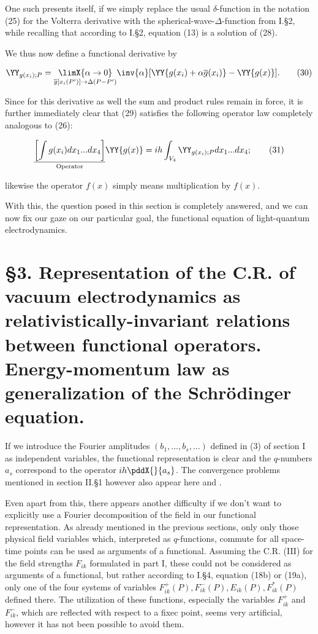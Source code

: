 \documentclass{article}
\newcommand{\nequ}[2]{
\begin{align*}
#1
\tag{#2}
\end{align*}
}
\begin{document}
One such presents itself, if we simply replace the usual $\delta$-function in the notation (25) for the Volterra derivative with the spherical-wave-$\Delta$-function from I.§2, while recalling that according to I.§2, equation (13) is a solution of (28).

We thus now define a functional derivative by
\nequ{
\YY_{g(x_i);P} =\underset{
 \overline{g}\left[x_i(P')\right] \to \Delta(P-P')
}{\limX{\alpha\to 0}}
\inv{\alpha}[\YY\{g(x_i) + \alpha\overline{g}(x_i)\}
 - \YY\{g(x)\}
].}{30}
Since for this derivative as well the sum and product rules remain in force, it is further immediately clear that (29) satisfies the following operator law completely analogous to (26):
\nequ{
\underset{\text{Operator}}{\underline{\left[\int g(x_i)dx_1...dx_4\right]}}\YY\{g(x)\}
 = ih\int_{V_4}\YY_{g(x_i);P} dx_1 ... dx_4
 ;}{31}
likewise the operator $f(x)$ simply means multiplication by $f(x)$.

With this, the question posed in this section is completely answered, and we can now fix our gaze on our particular goal, the functional equation of light-quantum electrodynamics.

\section*{§3. Representation of the C.R. of vacuum electrodynamics as relativistically-invariant relations between functional operators. Energy-momentum law as generalization of the Schrödinger equation.}

If we introduce the Fourier amplitudes $(b_1 ,...,b_s,...)$ defined in (3) of section I as independent variables, the functional representation is clear and the $q$-numbers $a_s$ correspond to the operator $ih\pddX{}{a_s}$. The convergence problems mentioned in section II.§1 however also appear here and .

Even apart from this, there appears another difficulty if we don't want to explicitly use a Fourier decomposition of the field in our functional representation. As already mentioned in the previous sections, only only those physical field variables which, interpreted as $q$-functions, commute for all space-time points can be used as arguments of a functional. Assuming the C.R. (III) for the field strengths $F_{ik}$ formulated in part I, these could not be considered as arguments of a functional, but rather according to I.§4, equation (18b) or (19a), only one of the four systems of variables $F^+_{ik}(P),F^-_{ik}(P),E_{ik}(P),F^*_{ik}(P)$ defined there. The utilization of these functions, especially the variables $F^+_{ik}$ and $F^-_{ik}$, which are reflected with respect to a fixec point, seems very artificial, however it has not been possible to avoid them.
\end{document}
